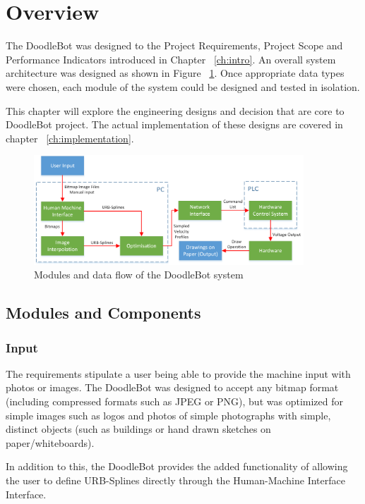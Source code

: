 \section{Overview}
	The DoodleBot was designed to the Project Requirements, Project Scope and Performance Indicators introduced in Chapter ~\ref{ch:intro}. An overall system architecture was designed as shown in Figure ~\ref{fig:system}. Once appropriate data types were chosen, each module of the system could be designed and tested in isolation. 
	
	This chapter will explore the engineering designs and decision that are core to DoodleBot project. The actual implementation of these designs are covered in chapter ~\ref{ch:implementation}.

\begin{figure}[h]
\centering
\includegraphics[width=0.9\textwidth]{figures/systemDesign/overview.png}
\caption{Modules and data flow of the DoodleBot system}
\label{fig:system}
\end{figure}

\subsection{Modules and Components}
	\subsubsection*{Input}
		The requirements stipulate a user being able to provide the machine input with photos or images. The DoodleBot was designed to accept any bitmap format (including compressed formats such as JPEG or PNG), but was optimized for simple images such as logos and photos of simple photographs with simple, distinct objects (such as buildings or hand drawn sketches on paper/whiteboards).
		
		In addition to this, the DoodleBot provides the added functionality of allowing the user to define URB-Splines directly through the Human-Machine Interface Interface.
		
